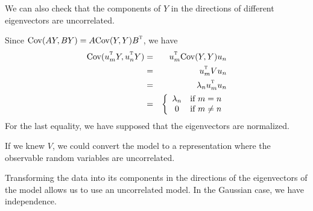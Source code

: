 \begin{frame}[fragile]

\bi
\item  We can also check that the components of $Y$ in the directions of different eigenvectors are uncorrelated.

\item Since $\cov(AY,BY)=A\cov(Y,Y)B^\transpose$, we have
\begin{eqnarray*}
\cov(\ev_m^\transpose Y, \ev_n^\transpose Y) &=& \ev_m^\transpose \cov(Y,Y) \ev_n
\\
&=& \ev_m^\transpose V \ev_n
\\
&=&\lambda_n \ev_m^\transpose \ev_n
\\
&=& \left\{
  \begin{array}{cc} 
    \lambda_n & \mbox{if $m=n$} \\
    0 & \mbox{if $m\neq n$}
  \end{array}
\right.
\end{eqnarray*}
For the last equality, we have supposed that the eigenvectors are normalized.

\item  If we knew $V$, we could convert the model to a representation where the observable random variables are uncorrelated. 

\item  Transforming the data into its components in the directions of the eigenvectors of the model allows us to use an uncorrelated model. In the Gaussian case, we have independence.

\ei

\end{frame}

